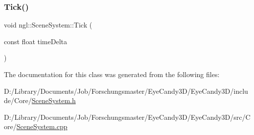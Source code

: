 \mbox{\label{classngl_1_1_scene_system_aea13b1a75ea4c635ee61207df97f0635}} 
\subsubsection{\texorpdfstring{Tick()}{Tick()}}
{\footnotesize\ttfamily void ngl\+::\+Scene\+System\+::\+Tick (\begin{DoxyParamCaption}\item[{const float}]{time\+Delta }\end{DoxyParamCaption})}



The documentation for this class was generated from the following files\+:\begin{DoxyCompactItemize}
\item 
D\+:/\+Library/\+Documents/\+Job/\+Forschungsmaster/\+Eye\+Candy3\+D/\+Eye\+Candy3\+D/include/\+Core/\mbox{\hyperlink{_scene_system_8h}{Scene\+System.\+h}}\item 
D\+:/\+Library/\+Documents/\+Job/\+Forschungsmaster/\+Eye\+Candy3\+D/\+Eye\+Candy3\+D/src/\+Core/\mbox{\hyperlink{_scene_system_8cpp}{Scene\+System.\+cpp}}\end{DoxyCompactItemize}
